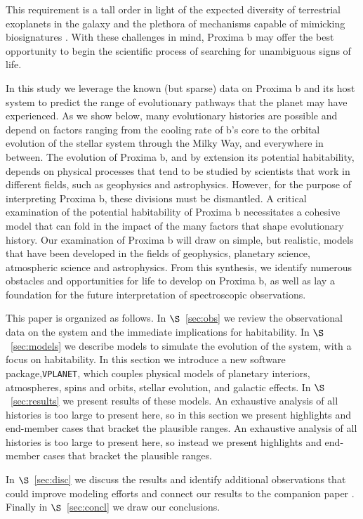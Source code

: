 \documentclass[preprint,12pt]{aastex}
\def\vplanet{\texttt{\footnotesize{VPLANET}}\xspace}
\begin{document}
This requirement is a tall order in light of the expected diversity of
terrestrial exoplanets in the galaxy and the plethora of mechanisms
capable of mimicking biosignatures \citep{Schwieterman16,Meadows16}.
With these challenges in mind, Proxima b may offer the best
opportunity to begin the scientific process of searching for
unambiguous signs of life.

In this study we leverage the known (but sparse) data on Proxima b and
its host system to predict the range of evolutionary pathways that the
planet may have experienced. As we show below, many evolutionary histories are
possible and depend on factors ranging from the cooling rate of b's
core to the orbital evolution of the stellar system through the Milky
Way, and everywhere in between. The evolution of Proxima b, and by
extension its potential habitability, depends on physical processes
that tend to be studied by scientists that work in different
fields, such as geophysics and astrophysics. However, for the purpose
of interpreting Proxima b, these divisions must be dismantled. A critical examination of the potential habitability of Proxima b necessitates
a cohesive model that can fold in the impact of the many factors that shape evolutionary
history. Our examination of Proxima b will draw on simple, but realistic, models
that have been developed in the fields of geophysics, planetary
science, atmospheric science and astrophysics. From this synthesis, we
identify numerous obstacles and opportunities for life to develop on
Proxima b, as well as lay a foundation for the future interpretation
of spectroscopic observations.

This paper is organized as follows. In $\S$~\ref{sec:obs} we review
the observational data on the system and the immediate implications
for habitability. In $\S$~\ref{sec:models} we describe models to
simulate the evolution of the system, with a focus on habitability. In
this section we introduce a new software package,\vplanet, which
couples physical models of planetary interiors, atmospheres, spins and
orbits, stellar evolution, and galactic effects. In
$\S$~\ref{sec:results} we present results of these models. An
exhaustive analysis of all histories is too large to present here, so
in this section we present highlights and end-member cases that
bracket the plausible ranges. An exhaustive analysis of all histories
is too large to present here, so instead we present highlights and
end-member cases that bracket the plausible ranges.

In $\S$~\ref{sec:disc} we discuss the
results and identify additional observations that could improve
modeling efforts and connect our results to the companion paper
\citep{Meadows16}. Finally in $\S$~\ref{sec:concl} we draw our
conclusions.
\end{document}
